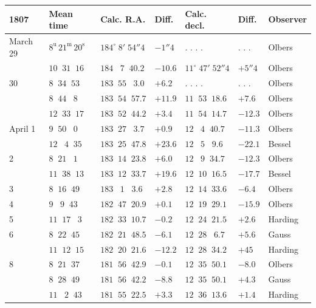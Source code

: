 \begingroup\fontsize{9}{11}\selectfont\setlength{\tabcolsep}{2.5pt}\renewcommand{\arraystretch}{1.10}
\begin{longtable}{l|l|l|l|l|l|l}
1807 & Mean time & Calc. R.A. & Diff. & Calc. decl. & Diff. & Observer \\
\hline
\endhead
March 29 & $8^{\mathrm u}\,21^{\mathrm m}\,20^{\mathrm s}$ & $184^\circ\;8'\;54''4$ & $-1''4$ & . . . . & . . . & Olbers \\
        & $10\;\;31\;\;16$ & $184\;\;\;7\;\;40.2$ & $-10.6$ & $11^\circ\;47'\;52''4$ & $+5''4$ & Olbers \\
30      & $8\;\;34\;\;53$ & $183\;\;55\;\;\;3.0$ & $+6.2$ & . . . . & . . . & Olbers \\
        & $8\;\;44\;\;\;8$ & $183\;\;54\;\;57.7$ & $+11.9$ & $11\;\;53\;\;18.6$ & $+7.6$ & Olbers \\
        & $12\;\;33\;\;17$ & $183\;\;52\;\;44.2$ & $+3.4$ & $11\;\;54\;\;14.7$ & $-12.3$ & Olbers \\
April 1 & $9\;\;50\;\;\;0$ & $183\;\;27\;\;\;3.7$ & $+0.9$ & $12\;\;\;4\;\;40.7$ & $-11.3$ & Olbers \\
        & $12\;\;\;4\;\;35$ & $183\;\;25\;\;47.8$ & $+23.6$ & $12\;\;\;5\;\;\;9.6$ & $-22.1$ & Bessel \\
2       & $8\;\;21\;\;\;1$ & $183\;\;14\;\;23.8$ & $+6.0$ & $12\;\;\;9\;\;34.7$ & $-12.3$ & Olbers \\
        & $11\;\;38\;\;13$ & $183\;\;12\;\;33.7$ & $+19.6$ & $12\;\;10\;\;16.5$ & $-17.7$ & Bessel \\
3       & $8\;\;16\;\;49$ & $183\;\;\;1\;\;\;3.6$ & $+2.8$ & $12\;\;14\;\;33.6$ & $-6.4$ & Olbers \\
4       & $9\;\;\;9\;\;43$ & $182\;\;47\;\;20.9$ & $+0.1$ & $12\;\;19\;\;29.1$ & $-15.9$ & Olbers \\
5       & $11\;\;17\;\;\;3$ & $182\;\;33\;\;10.7$ & $-0.2$ & $12\;\;24\;\;21.5$ & $+2.6$ & Harding \\
6       & $8\;\;22\;\;45$ & $182\;\;21\;\;48.5$ & $-6.1$ & $12\;\;28\;\;\;6.7$ & $+5.6$ & Gauss \\
        & $11\;\;12\;\;15$ & $182\;\;20\;\;21.6$ & $-12.2$ & $12\;\;28\;\;34.2$ & $+45$ & Harding \\
8       & $8\;\;21\;\;37$ & $181\;\;56\;\;42.9$ & $-0.1$ & $12\;\;35\;\;50.1$ & $-8.0$ & Olbers \\
        & $8\;\;28\;\;49$ & $181\;\;56\;\;42.2$ & $-8.8$ & $12\;\;35\;\;50.1$ & $+4.3$ & Gauss \\
        & $11\;\;\;2\;\;43$ & $181\;\;55\;\;22.5$ & $+3.3$ & $12\;\;36\;\;13.6$ & $+1.4$ & Harding \\

\end{longtable}
